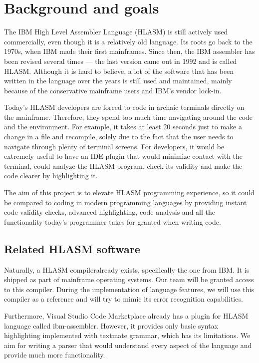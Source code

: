 \chapter{Background and goals}


The IBM High Level Assembler Language (HLASM) is still actively used commercially, even though it is a relatively old language. Its roots go back to the 1970s, when IBM made their first mainframes. Since then, the IBM assembler has been revised several times --- the last version came out in 1992 and is called HLASM. Although it is hard to believe, a lot of the software that has been written in the language over the years is still used and maintained, mainly because of the conservative mainframe users and IBM's vendor lock-in.

Today's HLASM developers are forced to code in archaic terminals directly on the mainframe. Therefore, they spend too much time navigating around the code and the environment. For example, it takes at least 20 seconds just to make a change in a file and recompile, solely due to the fact that the user needs to navigate through plenty of terminal screens. For developers, it would be extremely useful to have an IDE plugin that would minimize contact with the terminal, could analyze the HLASM program, check its validity and make the code clearer by highlighting it. 

The aim of this project is to elevate HLASM programming experience, so it could be compared to coding in modern programming languages by providing instant code validity checks, advanced highlighting, code analysis and all the functionality today's programmer takes for granted when writing code.

\section{Related HLASM software}
Naturally, a HLASM compiler\footnotemark already exists, specifically the one from IBM. It is shipped as part of mainframe operating systems. Our team will be granted access to this compiler. During the implementation of language features, we will use this compiler as a reference and will try to mimic its error recognition capabilities.

Furthermore, Visual Studio Code Marketplace already has a plugin for HLASM language called ibm\nobreakdash-assembler\footnotemark. However, it provides only basic syntax highlighting implemented with textmate grammar, which has its limitations. We aim for writing a parser that would understand every aspect of the language and provide much more functionality.
